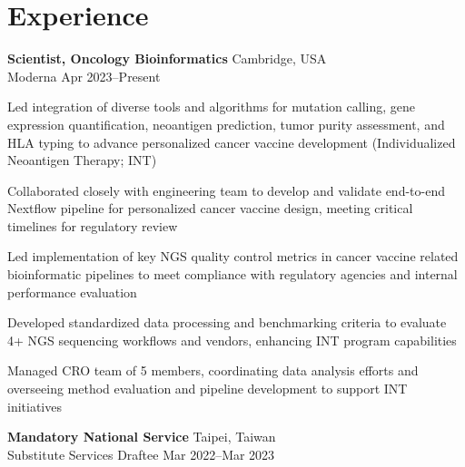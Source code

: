\section{Experience}

\begin{entrylist}

\item \textbf{Scientist, Oncology Bioinformatics} \hfill Cambridge, USA\\
    Moderna \hfill
    Apr 2023--Present
\begin{detaillist}
    \item Led integration of diverse tools and algorithms for mutation calling, gene expression quantification, neoantigen prediction, tumor purity assessment, and HLA typing to advance personalized cancer vaccine development (Individualized Neoantigen Therapy; INT)
    \item Collaborated closely with engineering team to develop and validate end-to-end Nextflow pipeline for personalized cancer vaccine design, meeting critical timelines for regulatory review
    \item Led implementation of key NGS quality control metrics in cancer vaccine related bioinformatic pipelines to meet compliance with regulatory agencies and internal performance evaluation
    \item Developed standardized data processing and benchmarking criteria to evaluate 4+ NGS sequencing workflows and vendors, enhancing INT program capabilities
    \item Managed CRO team of 5 members, coordinating data analysis efforts and overseeing method evaluation and pipeline development to support INT initiatives
\end{detaillist}

\item \textbf{Mandatory National Service} \hfill Taipei, Taiwan\\
Substitute Services Draftee \hfill
Mar 2022--Mar 2023


\end{entrylist}
